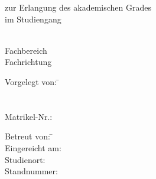 \begin{titlepage}

\begin{minipage}{\textwidth}
		\noindent \hfill 
\end{minipage}
\vspace{4em}

\begin{center}
    {\huge \art}

    {\Large zur Erlangung des akademischen Grades \akadGrad}\\
    {\Large im Studiengang \studiengang}

    \vspace{4em}

    \textbf{{\Large \titel}}

    \vspace{4em}

    \hochschule \\
    Fachbereich \fachbereich \\
    Fachrichtung \fachrichtung

    \vspace{10em}

	\begin{multicols}{2}
	\begin{minipage}{\textwidth}
		\begin{tabbing}

		Vorgelegt von:  \hspace*{0.5em}\= \autor \\
		\> \strasseAutor \\
        \> \stadtAutor \\
        Matrikel-Nr.: \> \matrikelnr
        \end{tabbing}
    \end{minipage}
        
	\begin{minipage}{\textwidth}
		\begin{tabbing}
		 
        Betreut von: \hspace*{1.5em}\= \betreuer \\
        Eingereicht am: \> \datumAbgabe \\
        Studienort: \> \ort \\
        Standnummer: \> \standnummer
		\end{tabbing}

	\end{minipage}
	\end{multicols}
\end{center}
\end{titlepage}
